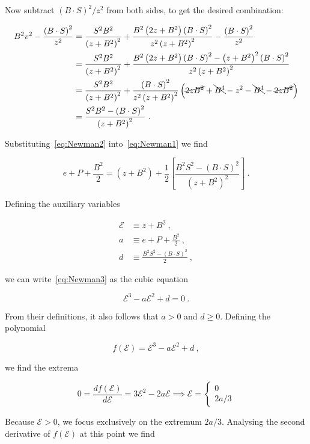 \documentclass{article}
\newcommand{\BdotS}{B\cdot S}
\newcommand{\Eps}{\mathcal{E}}
\newcommand{\eq}[1]{
\begin{equation}
    #1
\end{equation}
}
\newcommand{\spl}[1]{
\eq{
\begin{split}
    #1
\end{split}
}
}
\newcommand{\al}[1] {
\begin{align}
    #1
\end{align}
}
\begin{document}
\noindent Now subtract $\left(\BdotS\right)^{2}/z^{2}$ from both sides, to get the desired combination:

\spl{
  B^{2}v^{2} - \frac{\left(\BdotS\right)^{2}}{z^{2}} &= \frac{S^{2}B^{2}}{\left(z+B^{2}\right)^{2}} + \frac{B^{2}\left(2z + B^{2}\right)\left(\BdotS\right)^{2}}{z^{2}\left(z+B^{2}\right)^{2}} - \frac{\left(\BdotS\right)^{2}}{z^{2}}\\
  &= \frac{S^{2}B^{2}}{\left(z+B^{2}\right)^{2}} + \frac{B^{2}\left(2z+B^{2}\right)\left(\BdotS\right)^{2} - \left(z+B^{2}\right)^{2}\left(\BdotS\right)^{2}}{z^{2}\left(z+B^{2}\right)^{2}}\\
  &= \frac{S^{2}B^{2}}{\left(z+B^{2}\right)^{2}} + \frac{\left(\BdotS\right)^{2}}{z^{2}\left(z+B^{2}\right)^{2}}\left(\cancel{2zB^{2}} + \bcancel{B^{4}} - z^{2} - \bcancel{B^{4}} - \cancel{2zB^{2}}\right)\\
  &= \frac{S^{2}B^{2} - \left(\BdotS\right)^{2}}{\left(z+B^{2}\right)^{2}}\ .\label{eq:Newman2}
}

\noindent Substituting~\eqref{eq:Newman2} into~\eqref{eq:Newman1} we find

\eq{
  e + P + \frac{B^{2}}{2} = \left(z+B^{2}\right) + \frac{1}{2}\left[\frac{B^{2}S^{2} - \left(\BdotS\right)^{2}}{\left(z+B^{2}\right)^{2}}\right]\ .\label{eq:Newman3}
}

\noindent Defining the auxiliary variables

\al{
  \Eps &\equiv z + B^{2}\ ,\\
  a &\equiv e + P + \frac{B^{2}}{2}\ ,\\
  d &\equiv \frac{B^{2}S^{2} - \left(\BdotS\right)^{2}}{2}\ ,
}

\noindent we can write~\eqref{eq:Newman3} as the cubic equation

\eq{
  \boxed{\Eps^{3} - a\Eps^{2} + d = 0}\ .
}

\noindent From their definitions, it also follows that $a>0$ and $d\geq0$. Defining the polynomial

\eq{
  f\left(\Eps\right) = \Eps^{3} - a\Eps^{2} + d\ ,\label{eq:Newmanf}
}

\noindent we find the extrema

\eq{
  0 = \frac{df\left(\Eps\right)}{d\Eps} = 3\Eps^{2} - 2a\Eps \implies \Eps = \left\{
    \begin{matrix}
      0\\
      2a/3
    \end{matrix}
    \right.
}

\noindent Because $\Eps > 0$, we focus exclusively on the extremum $2a/3$. Analysing the second derivative of $f(\Eps)$ at this point we find
\end{document}
